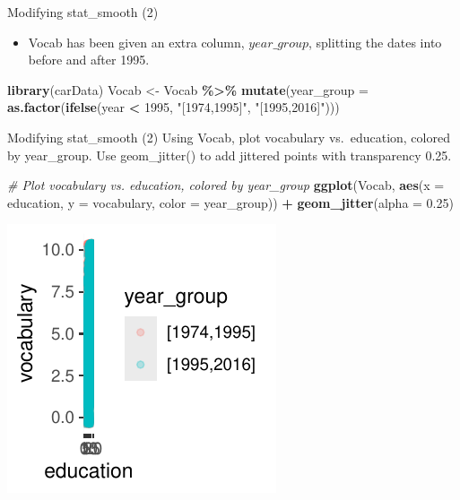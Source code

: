 \documentclass[
  ignorenonframetext,
]{beamer}
\newenvironment{Shaded}{\begin{snugshade}}{\end{snugshade}}
\newcommand{\AttributeTok}[1]{\textcolor[rgb]{0.13,0.29,0.53}{#1}}
\newcommand{\CommentTok}[1]{\textcolor[rgb]{0.56,0.35,0.01}{\textit{#1}}}
\newcommand{\DecValTok}[1]{\textcolor[rgb]{0.00,0.00,0.81}{#1}}
\newcommand{\FloatTok}[1]{\textcolor[rgb]{0.00,0.00,0.81}{#1}}
\newcommand{\FunctionTok}[1]{\textcolor[rgb]{0.13,0.29,0.53}{\textbf{#1}}}
\newcommand{\NormalTok}[1]{#1}
\newcommand{\OtherTok}[1]{\textcolor[rgb]{0.56,0.35,0.01}{#1}}
\newcommand{\SpecialCharTok}[1]{\textcolor[rgb]{0.81,0.36,0.00}{\textbf{#1}}}
\newcommand{\StringTok}[1]{\textcolor[rgb]{0.31,0.60,0.02}{#1}}
\providecommand{\tightlist}{%
  \setlength{\itemsep}{0pt}\setlength{\parskip}{0pt}}
\begin{document}
\begin{frame}[fragile]{Modifying stat\_smooth (2)}
\label{modifying-stat_smooth-2-1}
\begin{itemize}
\tightlist
\item
  Vocab has been given an extra column, \(year\_group\), splitting the
  dates into before and after 1995.
\end{itemize}


\begin{Shaded}
\begin{Highlighting}[]
\FunctionTok{library}\NormalTok{(carData)}
\NormalTok{Vocab }\OtherTok{\textless{}{-}}\NormalTok{ Vocab }\SpecialCharTok{\%\textgreater{}\%}
    \FunctionTok{mutate}\NormalTok{(}\AttributeTok{year\_group =} \FunctionTok{as.factor}\NormalTok{(}\FunctionTok{ifelse}\NormalTok{(year }\SpecialCharTok{\textless{}} \DecValTok{1995}\NormalTok{, }\StringTok{"[1974,1995]"}\NormalTok{,}
        \StringTok{"[1995,2016]"}\NormalTok{)))}
\end{Highlighting}
\end{Shaded}
\end{frame}

\begin{frame}[fragile]{Modifying stat\_smooth (2)}
\label{modifying-stat_smooth-2-2}
Using Vocab, plot vocabulary vs.~education, colored by year\_group. Use
geom\_jitter() to add jittered points with transparency 0.25.


\begin{Shaded}
\begin{Highlighting}[]
\CommentTok{\# Plot vocabulary vs. education, colored by year\_group}
\FunctionTok{ggplot}\NormalTok{(Vocab, }\FunctionTok{aes}\NormalTok{(}\AttributeTok{x =}\NormalTok{ education, }\AttributeTok{y =}\NormalTok{ vocabulary, }\AttributeTok{color =}\NormalTok{ year\_group)) }\SpecialCharTok{+}
    \FunctionTok{geom\_jitter}\NormalTok{(}\AttributeTok{alpha =} \FloatTok{0.25}\NormalTok{)}
\end{Highlighting}
\end{Shaded}

\begin{center}\includegraphics[width=0.5\linewidth]{Figs/unnamed-chunk-15-1} \end{center}
\end{frame}
\end{document}
